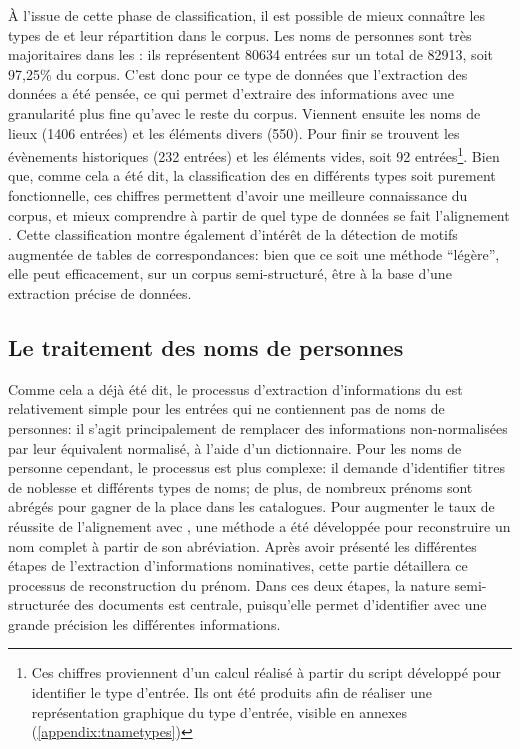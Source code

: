À l'issue de cette phase de classification, il est possible de mieux connaître les types de \tname{} et leur répartition dans le corpus. Les noms de personnes sont très majoritaires dans les \tname{}: ils représentent 80634 entrées sur un total de 82913, soit 97,25\% du corpus. C'est donc pour ce type de données que l'extraction des données a été pensée, ce qui permet  d'extraire des informations avec une granularité plus fine qu'avec le reste du corpus. Viennent ensuite les noms de lieux (1406 entrées) et les éléments divers (550). Pour finir se trouvent les évènements historiques (232 entrées) et les éléments vides, soit 92 entrées\footnote{Ces chiffres proviennent d'un calcul réalisé à partir du script développé pour identifier le type d'entrée. Ils ont été produits afin de réaliser une représentation graphique du type d'entrée, visible en annexes (\ref{appendix:tnametypes})}. Bien que, comme cela a été dit, la classification des \tname{} en différents types soit purement fonctionnelle, ces chiffres permettent d'avoir une meilleure connaissance du corpus, et mieux comprendre à partir de quel type de données se fait l'alignement \wkd{}. Cette classification montre également d'intérêt de la détection de motifs augmentée de tables de correspondances: bien que ce soit une méthode \enquote{légère}, elle peut efficacement, sur un corpus semi-structuré, être à la base d'une extraction précise de données.


\subsection{Le traitement des noms de personnes}
Comme cela a déjà été dit, le processus d'extraction d'informations du \tname{} est relativement simple pour les entrées qui ne contiennent pas de noms de personnes: il s'agit principalement de remplacer des informations non-normalisées par leur équivalent normalisé, à l'aide d'un dictionnaire. Pour les noms de personne cependant, le processus est plus complexe: il demande d'identifier titres de noblesse et différents types de noms; de plus, de nombreux prénoms sont abrégés pour gagner de la place dans les catalogues. Pour augmenter le taux de réussite de l'alignement avec \wkd{}, une méthode a été développée pour reconstruire un nom complet à partir de son abréviation. Après avoir présenté les différentes étapes de l'extraction d'informations nominatives, cette partie détaillera ce processus de reconstruction du prénom. Dans ces deux étapes, la nature semi-structurée des documents est centrale, puisqu'elle permet d'identifier avec une grande précision les différentes informations.

